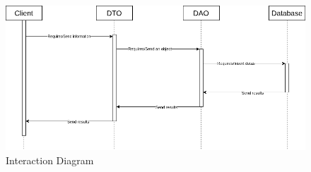 
\begin{figure}[H]
  \centering
  \includegraphics[width=\textwidth]{images/UML-interaction.png}
  \caption{Interaction Diagram}
  \label{fig:interaction-diagram}
\end{figure}
